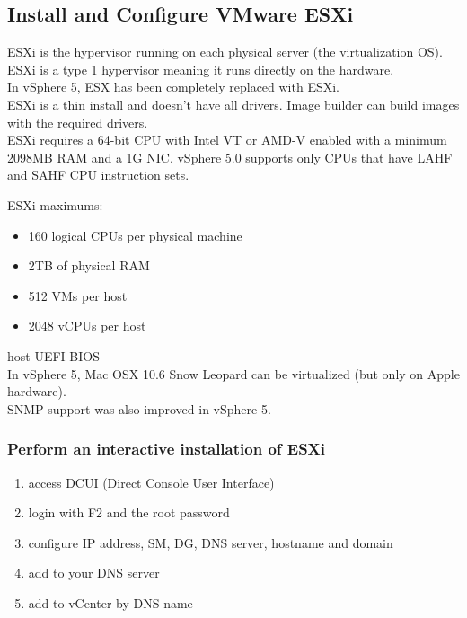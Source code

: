 \subsection{Install and Configure VMware ESXi}

ESXi is the hypervisor running on each physical server (the virtualization
OS). ESXi is a type 1 hypervisor meaning it runs directly on the hardware.\\

In vSphere 5, ESX has been completely replaced with ESXi.\\

ESXi is a thin install and doesn't have all drivers. Image builder can build
images with the required drivers.\\

ESXi requires a 64-bit CPU with Intel VT or AMD-V enabled with a minimum
2098MB RAM and a 1G NIC. vSphere 5.0 supports only CPUs that have LAHF and
SAHF CPU instruction sets.

ESXi maximums:

\begin{itemize}

\item 160 logical CPUs per physical machine
\item 2TB of physical RAM
\item 512 VMs per host
\item 2048 vCPUs per host

\end{itemize}

host UEFI BIOS\\

In vSphere 5, Mac OSX 10.6 Snow Leopard can be virtualized (but only on Apple
hardware).\\

SNMP support was also improved in vSphere 5.

\subsubsection{Perform an interactive installation of ESXi}

\begin{enumerate}
\item access DCUI (Direct Console User Interface)
\item login with F2 and the root password
\item configure IP address, SM, DG, DNS server, hostname and domain
\item add to your DNS server
\item add to vCenter by DNS name
\end{enumerate}


